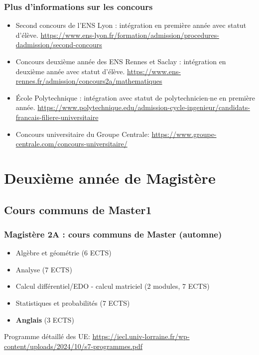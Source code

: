 \documentclass[slidetop,11pt]{beamer}
\begin{document}
\begin{frame}
\frametitle{Plus d'informations sur les concours}


\begin{itemize}
\item \og Second concours\fg{} de l'ENS Lyon : intégration en première année avec statut d'élève. \url{https://www.ens-lyon.fr/formation/admission/procedures-dadmission/second-concours}
\item \og Concours deuxième année\fg{} des ENS Rennes et Saclay :  intégration en deuxième année avec statut d'élève. \url{https://www.ens-rennes.fr/admission/concours2a/mathematiques}
\item École Polytechnique : intégration avec statut de polytechnicien$\cdot$ne en première année. \url{https://www.polytechnique.edu/admission-cycle-ingenieur/candidats-francais-filiere-universitaire}
\item Concours universitaire du Groupe Centrale: \url{https://www.groupe-centrale.com/concours-universitaire/}
\end{itemize}

\end{frame}


\section{Deuxième année de Magistère}

\subsection{Cours communs de Master1}
\begin{frame}
\frametitle{Magistère 2A : cours communs de Master (automne)}
\begin{itemize}
\item Algèbre et géométrie (6 ECTS)
\item Analyse (7 ECTS)
\item Calcul différentiel/EDO - calcul matriciel (2 modules, 7 ECTS)
\item Statistiques et probabilités (7 ECTS)
\item \textbf{Anglais} (3 ECTS)
\end{itemize}

\bigskip
Programme détaillé des UE: 
\url{https://iecl.univ-lorraine.fr/wp-content/uploads/2024/10/s7-programmes.pdf}
\end{frame}
\end{document}
